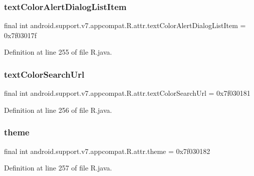 \subsubsection{\texorpdfstring{textColorAlertDialogListItem}{textColorAlertDialogListItem}}
{\footnotesize\ttfamily final int android.\+support.\+v7.\+appcompat.\+R.\+attr.\+text\+Color\+Alert\+Dialog\+List\+Item = 0x7f03017f\hspace{0.3cm}{\ttfamily [static]}}



Definition at line 255 of file R.\+java.

\mbox{\label{classandroid_1_1support_1_1v7_1_1appcompat_1_1_r_1_1attr_a90c011a6893d57e7ac36d2f522dac1ac}} 
\subsubsection{\texorpdfstring{textColorSearchUrl}{textColorSearchUrl}}
{\footnotesize\ttfamily final int android.\+support.\+v7.\+appcompat.\+R.\+attr.\+text\+Color\+Search\+Url = 0x7f030181\hspace{0.3cm}{\ttfamily [static]}}



Definition at line 256 of file R.\+java.

\mbox{\label{classandroid_1_1support_1_1v7_1_1appcompat_1_1_r_1_1attr_a182cfd2eff31084c29174d1a2ab3ada2}} 
\subsubsection{\texorpdfstring{theme}{theme}}
{\footnotesize\ttfamily final int android.\+support.\+v7.\+appcompat.\+R.\+attr.\+theme = 0x7f030182\hspace{0.3cm}{\ttfamily [static]}}



Definition at line 257 of file R.\+java.

